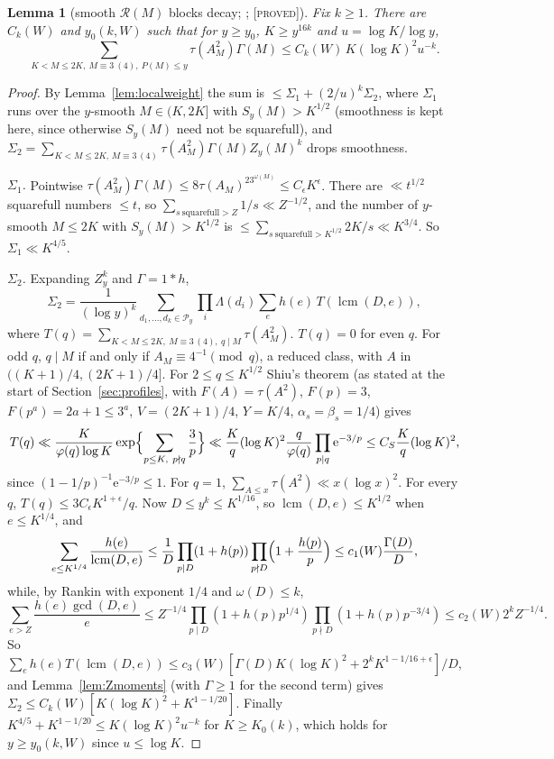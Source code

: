 \documentclass[10pt,reqno]{amsart}
\newtheorem{lemma}[theorem]{Lemma}
\theoremstyle{definition}
\theoremstyle{remark}
\newcommand{\cP}{\mathcal P}
\newcommand{\cR}{\mathscr R}
\newcommand{\lcm}{\operatorname{lcm}}
\newcommand{\e}{\mathrm e}
\newcommand{\lab}[1]{\textup{[\textsc{#1}]}}
\begin{document}
\begin{lemma}[smooth $\cR(M)$ blocks decay; {\cite[Lemma~2.3]{KA3}}; \lab{proved}]\label{lem:smoothR}
Fix $k\geq1$.  There are $C_k(W)$ and $y_0(k,W)$ such that for $y\geq y_0$,
$K\geq y^{16k}$ and $u=\log K/\log y$,
\[
 \sum_{K<M\leq2K,\ M\equiv3\ (4),\ P(M)\leq y}\tau(A_M^2)\Gamma(M)\leq C_k(W)\,K(\log K)^2u^{-k}.
\]
\end{lemma}
\begin{proof}
By Lemma~\ref{lem:localweight} the sum is $\leq\Sigma_1+(2/u)^k\Sigma_2$, where
$\Sigma_1$ runs over the $y$-smooth $M\in(K,2K]$ with $S_y(M)>K^{1/2}$ (smoothness
is kept here, since otherwise $S_y(M)$ need not be squarefull), and
$\Sigma_2=\sum_{K<M\leq2K,\,M\equiv3\,(4)}\tau(A_M^2)\Gamma(M)Z_y(M)^k$ drops smoothness.

\emph{$\Sigma_1$.}  Pointwise $\tau(A_M^2)\Gamma(M)\leq8\tau(A_M)^23^{\omega(M)}\leq C_\epsilon K^\epsilon$.
There are $\ll t^{1/2}$ squarefull numbers $\leq t$, so
$\sum_{s\ \text{squarefull}>Z}1/s\ll Z^{-1/2}$, and the number of $y$-smooth
$M\leq2K$ with $S_y(M)>K^{1/2}$ is $\leq\sum_{s\ \text{squarefull}>K^{1/2}}2K/s\ll K^{3/4}$.
So $\Sigma_1\ll K^{4/5}$.

\emph{$\Sigma_2$.}  Expanding $Z_y^k$ and $\Gamma=1*h$,
\[
 \Sigma_2=\frac1{(\log y)^k}\sum_{d_1,\dots,d_k\in\cP_y}\prod_i\Lambda(d_i)\sum_eh(e)\,T(\lcm(D,e)),
\]
where $T(q)=\sum_{K<M\leq2K,\ M\equiv3\,(4),\ q\mid M}\tau(A_M^2)$.
$T(q)=0$ for even $q$.  For odd $q$, $q\mid M$ if and only if
$A_M\equiv4^{-1}\pmod q$, a reduced class, with $A$ in
$((K+1)/4,(2K+1)/4]$.  For $2\leq q\leq K^{1/2}$ Shiu's theorem (as stated at
the start of Section~\ref{sec:profiles}, with $F(A)=\tau(A^2)$, $F(p)=3$,
$F(p^a)=2a+1\leq3^a$, $V=(2K+1)/4$, $Y=K/4$, $\alpha_s=\beta_s=1/4$) gives
\[
 T(q)\ll\frac K{\varphi(q)\log K}\exp\Bigl\{\sum_{p\leq K,\ p\nmid q}\frac3p\Bigr\}
 \ll\frac Kq(\log K)^2\frac q{\varphi(q)}\prod_{p\mid q}\e^{-3/p}\leq C_S\frac Kq(\log K)^2,
\]
since $(1-1/p)^{-1}\e^{-3/p}\leq1$.  For $q=1$,
$\sum_{A\leq x}\tau(A^2)\ll x(\log x)^2$.  For every $q$,
$T(q)\leq3C_\epsilon K^{1+\epsilon}/q$.  Now $D\leq y^k\leq K^{1/16}$, so
$\lcm(D,e)\leq K^{1/2}$ when $e\leq K^{1/4}$, and
\[
 \sum_{e\leq K^{1/4}}\frac{h(e)}{\lcm(D,e)}\leq\frac1D\prod_{p\mid D}(1+h(p))\prod_{p\nmid D}\Bigl(1+\frac{h(p)}p\Bigr)\leq c_1(W)\frac{\Gamma(D)}D,
\]
while, by Rankin with exponent $1/4$ and $\omega(D)\leq k$,
\[
 \sum_{e>Z}\frac{h(e)\gcd(D,e)}e\leq Z^{-1/4}\prod_{p\mid D}(1+h(p)p^{1/4})\prod_{p\nmid D}(1+h(p)p^{-3/4})\leq c_2(W)2^kZ^{-1/4}.
\]
So $\sum_eh(e)T(\lcm(D,e))\leq c_3(W)[\Gamma(D)K(\log K)^2+2^kK^{1-1/16+\epsilon}]/D$, and
Lemma~\ref{lem:Zmoments} (with $\Gamma\geq1$ for the second term) gives
$\Sigma_2\leq C_k(W)[K(\log K)^2+K^{1-1/20}]$.  Finally
$K^{4/5}+K^{1-1/20}\leq K(\log K)^2u^{-k}$ for $K\geq K_0(k)$, which holds for
$y\geq y_0(k,W)$ since $u\leq\log K$.
\end{proof}
\end{document}
